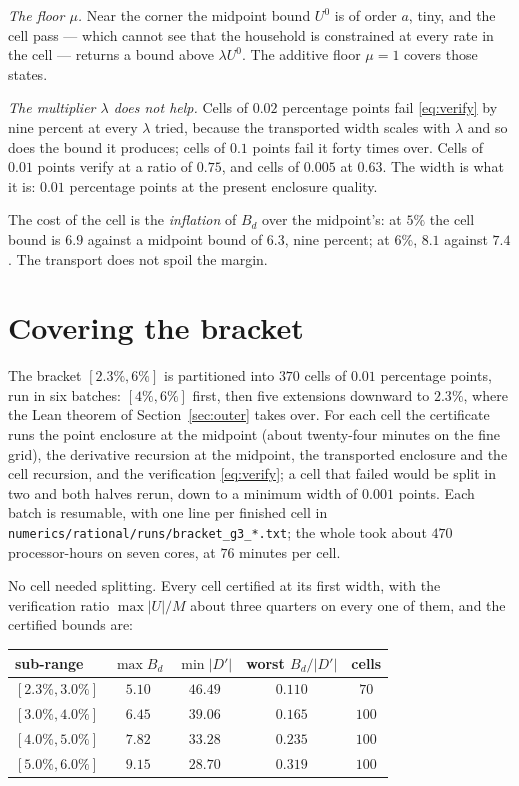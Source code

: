 \documentclass[11pt]{article}
\theoremstyle{definition}
\theoremstyle{remark}
\begin{document}
\emph{The floor $\mu$.} Near the corner the midpoint bound $U^0$ is of order $a$, tiny, and the
cell pass --- which cannot see that the household is constrained at every rate in the cell ---
returns a bound above $\lambda U^0$. The additive floor $\mu=1$ covers those states.

\emph{The multiplier $\lambda$ does not help.} Cells of $0.02$ percentage points fail
\eqref{eq:verify} by nine percent at every $\lambda$ tried, because the transported width scales
with $\lambda$ and so does the bound it produces; cells of $0.1$ points fail it forty times over.
Cells of $0.01$ points verify at a ratio of $0.75$, and cells of $0.005$ at $0.63$. The width is
what it is: $0.01$ percentage points at the present enclosure quality.

The cost of the cell is the \emph{inflation} of $B_d$ over the midpoint's: at $5\%$ the cell
bound is $6.9$ against a midpoint bound of $6.3$, nine percent; at $6\%$, $8.1$ against $7.4$. The
transport does not spoil the margin.

\section{Covering the bracket}\label{sec:bracket}

The bracket $[2.3\%,6\%]$ is partitioned into $370$ cells of $0.01$ percentage points, run in six
batches: $[4\%,6\%]$ first, then five extensions downward to $2.3\%$, where the Lean theorem of
Section~\ref{sec:outer} takes over. For each cell the certificate runs the point enclosure at the
midpoint (about twenty-four minutes on the fine grid), the derivative recursion at the midpoint, the
transported enclosure and the cell recursion, and the verification \eqref{eq:verify}; a cell that
failed would be split in two and both halves rerun, down to a minimum width of $0.001$ points. Each
batch is resumable, with one line per finished cell in
\texttt{numerics/rational/runs/bracket\_g3\_*.txt}; the whole took about $470$ processor-hours on
seven cores, at $76$ minutes per cell.

No cell needed splitting. Every cell certified at its first width, with the verification ratio
$\max|U|/M$ about three quarters on every one of them, and the certified bounds are:

\begin{center}
\begin{tabular}{@{}lcccc@{}}
\toprule
sub-range & $\max B_d$ & $\min|D'|$ & worst $B_d/|D'|$ & cells\\
\midrule
$[2.3\%,3.0\%]$ & $5.10$ & $46.49$ & $0.110$ & $70$\\
$[3.0\%,4.0\%]$ & $6.45$ & $39.06$ & $0.165$ & $100$\\
$[4.0\%,5.0\%]$ & $7.82$ & $33.28$ & $0.235$ & $100$\\
$[5.0\%,6.0\%]$ & $9.15$ & $28.70$ & $0.319$ & $100$\\
\bottomrule
\end{tabular}
\end{center}
\end{document}
